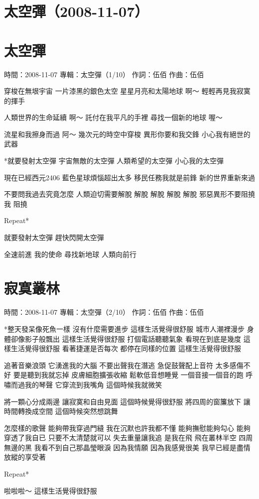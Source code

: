 \documentclass[UTF8,a4paper,oneside,twocolumn,12pt]{ctexbook}
\newcommand{\infopair}[2]{\textbullet #1：#2}
\newcommand{\zc}[1][伍佰]{\infopair{作詞}{#1}}
\newcommand{\zq}[1][伍佰]{\infopair{作曲}{#1}}
\newcommand{\zj}[1]{\infopair{專輯}{#1}}
\newcommand{\sj}[1]{\infopair{時間}{#1}}
\newenvironment{info}{\begin{flushleft}\kaishu
	}
	{\end{flushleft}\normalsize\yahei\par}
\newenvironment{lyric}{
	}
{}
\begin{document}
\section*{太空彈（2008-11-07）}
\section{太空彈}
\begin{info}
	\sj{2008-11-07}
	\zj{太空彈（1/10）}
	\zc
	\zq
\end{info}
\begin{lyric}
	穿梭在無垠宇宙
	一片漆黑的銀色太空
	星星月亮和太陽地球
	啊～ 輕輕再見我寂寞的揮手

	人類世界的生命延續
	啊～ 託付在我平凡的手裡
	尋找一個新的地球
	喔～

	流星和我擦身而過
	阿～ 幾次元的時空中穿梭
	異形你要和我交鋒
	小心我有絕世的武器

	*就要發射太空彈
	宇宙無敵的太空彈
	人類希望的太空彈
	小心我的太空彈

	現在已經西元2406
	藍色星球煩惱超出太多
	移民任務我就是前鋒
	新的世界重新來過

	不要問我過去究竟怎麼
	人類迫切需要解脫
	解脫 解脫 解脫 解脫
	邪惡異形不要阻撓我
	阻撓

	Repeat*

	就要發射太空彈
	趕快閃開太空彈

	全速前進 我的使命
	尋找新地球 人類向前行
\end{lyric}

\section{寂寞叢林}
\begin{info}
	\sj{2008-11-07}
	\zj{太空彈（2/10）}
	\zc
	\zq
\end{info}
\begin{lyric}
	*整天發呆像死魚一樣
	沒有什麼需要進步
	這樣生活覺得很舒服
	城市人潮裡漫步
	身體卻像影子般飄出
	這樣生活覺得很舒服
	打個電話聽聽氣象
	看現在到底是幾度
	這樣生活覺得很舒服
	看著捷運是否每次
	都停在同樣的位置
	這樣生活覺得很舒服

	追著音樂浪頭
	它湧進我的大腦
	不要出聲我在潛逃
	急促鼓聲配上音符
	太多感傷不好
	要是聽到我就忘掉
	皮膚細胞擴張收縮
	鬆軟低音想睡覺
	一個音接一個音的跑
	呼嘯而過我的琴聲
	它穿流到我嘴角
	這個時候我就微笑

	將一顆心分成兩邊
	讓寂寞和自由見面
	這個時候覺得很舒服
	將四周的窗簾放下
	讓時間轉換成空間
	這個時候突然想跳舞

	怎麼樣的歌聲
	能夠帶我穿過門縫
	我在沉默也許我都不懂
	能夠撫慰能夠勾心
	能夠穿透了我自已
	只要不太清楚就可以
	失去重量讓我追
	是我在飛
	飛在叢林半空
	四周無邊的黑
	我看不到自己那晶瑩眼淚
	因為我情願
	因為我感覺很美
	我早已經是盡情放縱的享受著

	Repeat*

	啦啦啦～
	這樣生活覺得很舒服
\end{lyric}
\end{document}
